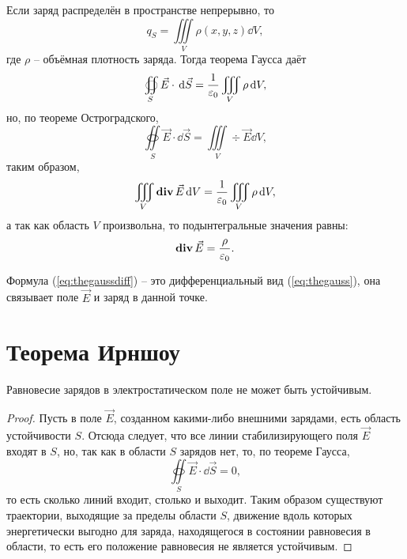     Если заряд распределён в пространстве непрерывно, то
    \[
        q_{S} = \iiint\limits_V \rho(x,y,z)\dd V ,
    \]
    где \( \rho \) -- объёмная плотность заряда. Тогда теорема Гаусса даёт
    \[
        \oiint\limits_S \vec{E}\cdot\,\mathrm{d}\vec{S} =             
        \frac{1}{\varepsilon_0}\iiint\limits_V\rho\,\mathrm{d} V,
    \]
    но, по теореме Остроградского,
    \[
        \oiint\limits_S \vec{E}\cdot\dd\vec{S} =
        \iiint\limits_V \div\vec{E}\dd V,
    \]
    таким образом,
    \[ 
        \iiint\limits_V \mathbf{div\,}\vec{E}\,\mathrm{d} V =
        \frac{1}{\varepsilon_0}\iiint\limits_V \rho\,\mathrm{d} V,
    \]
    а так как область \( V \) произвольна, то подынтегральные значения равны:
    \begin{equation}
        \label{eq:thegaussdiff}
        \mathbf{div\,}\vec{E} = \frac{\rho}{\varepsilon_0}.
    \end{equation}

    Формула (\ref{eq:thegaussdiff}) -- это дифференциальный вид
    (\ref{eq:thegauss}), она связывает поле \( \vec{E} \) и заряд в данной 
    точке.

\section{Теорема Ирншоу}

    \begin{theorem}[Ирншоу]
        Равновесие зарядов в электростатическом поле не может быть устойчивым.
    \end{theorem}

    \begin{proof}
        Пусть в поле \( \vec{E} \), созданном какими-либо внешними зарядами, 
        есть область устойчивости \( S \). Отсюда следует, что все линии 
        стабилизирующего поля \( \vec{E} \) входят в \( S \), но, так как в 
        области \( S \) зарядов нет, то, по теореме Гаусса,
        \[
            \oiint\limits_S \vec{E}\cdot\dd\vec{S} = 0,
        \]
        то есть сколько линий входит, столько и выходит. Таким образом 
        существуют траектории, выходящие за пределы области \( S \), движение 
        вдоль которых энергетически выгодно для заряда, находящегося в 
        состоянии равновесия в области, то есть его положение равновесия не 
        является устойчивым.
    \end{proof}

